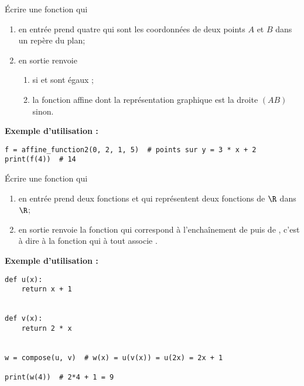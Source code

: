 \documentclass[a4paper,12pt,french]{article}
\begin{document}
\begin{exercice}
	\'Ecrire une fonction  qui 
\begin{enumerate}[--]
	\item 	en entrée prend quatre  qui sont les coordonnées de deux points $A$ et $B$ dans un repère du plan;
	\item 	en sortie renvoie 
	\begin{enumerate}[--]
		\item 	{} si  et  sont égaux ;
		\item 	la fonction affine dont la représentation graphique est la droite $(AB)$ sinon.
	\end{enumerate}
\end{enumerate}
\textbf{Exemple d'utilisation :}
\begin{verbatim}
f = affine_function2(0, 2, 1, 5)  # points sur y = 3 * x + 2
print(f(4))  # 14
\end{verbatim}
\end{exercice}

\begin{exercice}
	\'Ecrire une fonction  qui 
\begin{enumerate}[--]
	\item 	en entrée prend deux fonctions  et  qui représentent deux fonctions de $\R$ dans $\R$;
	\item 	en sortie renvoie la fonction qui correspond à l'enchaînement de  puis de , c'est à dire à la fonction qui à tout   associe .
\end{enumerate}
\textbf{Exemple d'utilisation :}
\begin{verbatim}
def u(x):
    return x + 1


def v(x):
    return 2 * x


w = compose(u, v)  # w(x) = u(v(x)) = u(2x) = 2x + 1

print(w(4))  # 2*4 + 1 = 9
\end{verbatim}

\end{exercice}
\end{document}
